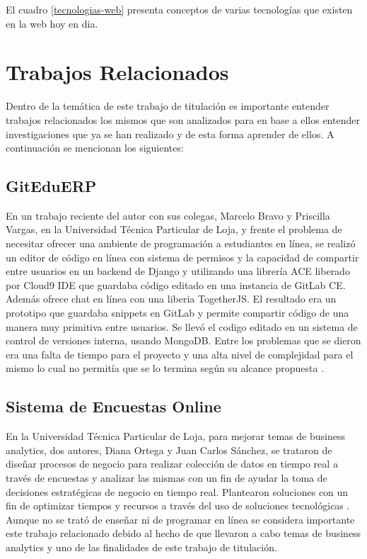 El cuadro \ref{tecnologias-web} presenta conceptos de varias tecnologías que existen en la web hoy en dia.

\pagebreak

\section{Trabajos Relacionados}
Dentro de la temática de este trabajo de titulación es importante entender trabajos relacionados los mismos que son analizados para en base a ellos entender investigaciones que ya se han realizado y de esta forma aprender de ellos. A continuación se mencionan los siguientes:

\subsection{GitEduERP}
En un trabajo reciente del autor con sus colegas, Marcelo Bravo y Priscilla Vargas, en la Universidad Técnica Particular de Loja, y frente el problema de necesitar ofrecer una ambiente de programación a estudiantes en línea, se realizó un editor de código en línea con sistema de permisos y la capacidad de compartir entre usuarios en un backend de Django y utilizando una librería ACE liberado por Cloud9 IDE que guardaba código editado en una instancia de GitLab CE. Además ofrece chat en línea con una liberia TogetherJS. El resultado era un prototipo que guardaba snippets en GitLab y permite compartir código de una manera muy primitiva entre usuarios. Se llevó el codigo editado en un sistema de control de versiones interna, usando MongoDB. Entre los problemas que se dieron era una falta de tiempo para el proyecto y una alta nivel de complejidad para el mismo lo cual no permitía que se lo termina según su alcance propuesta \citep{UTPL-GitEduERP}.

\subsection{Sistema de Encuestas Online}
En la Universidad Técnica Particular de Loja, para mejorar temas de business analytics, dos autores, Diana Ortega y Juan Carlos Sánchez, se trataron de diseñar procesos de negocio para realizar colección de datos en tiempo real a través de encuestas y analizar las mismas con un fin de ayudar la toma de decisiones estratégicas de negocio en tiempo real. Plantearon soluciones con un fin de optimizar tiempos y recursos a través del uso de soluciones tecnológicas \citep{UTPL-Thesis-Encuestas-Online}. Aunque no se trató de enseñar ni de programar en línea se considera importante este trabajo relacionado debido al hecho de que llevaron a cabo temas de business analytics y uno de las finalidades de este trabajo de titulación.

